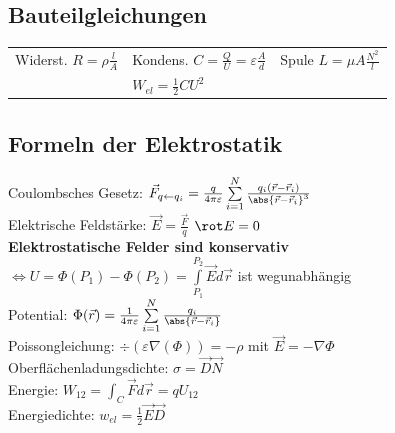 \subsection{Bauteilgleichungen}
\setlength{\tabcolsep}{6pt}
\begin{tabular*}{\columnwidth}{@{\extracolsep\fill}lll@{}} \trule
    Widerst. $R = \rho \frac{l}{A}$ & Kondens. $C=\frac{Q}{U} = \varepsilon \frac{A}{d}$ & Spule $L=\mu A \frac{N^2}{l}$\\
    & $W_{el} = \frac{1}{2} C U^2$
\end{tabular*}
\setlength{\tabcolsep}{4pt}



\subsection{Formeln der Elektrostatik}
Coulombsches Gesetz: $\vec F_{q \leftarrow q_i} = \frac{q}{4 \pi \varepsilon} \sum \limits_{i = 1}^N\frac{q_i (\vec r - \vec r_i )}{\abs{\vec r - \vec r_i}^3}$ \\
Elektrische Feldstärke: $\vec E = \frac{\vec F}{q} $ \quad $\rot E = 0$ \\
\textbf{Elektrostatische Felder sind konservativ} $\Leftrightarrow U = \Phi(P_1) - \Phi(P_2) = \int \limits_{P_1}^{P_2} \vec E d \vec r$ ist wegunabhängig \\
Potential: $\Phi (\vec r) = \frac{1}{4 \pi \varepsilon} \sum \limits_{i =1}^{N} \frac{q_i}{\abs{\vec r - \vec r_i}}$ \\
Poissongleichung: $\div(\varepsilon \nabla(\Phi)) = - \rho$ mit $\vec E = -\nabla \Phi$ \\
Oberflächenladungsdichte: $\sigma = \vec D  \vec N$ \\
Energie: $W_{12} = \int_C \vec F d \vec r = q  U_{12}$ \\
Energiedichte: $w_{el} = \frac{1}{2} \vec E \vec D$ \\